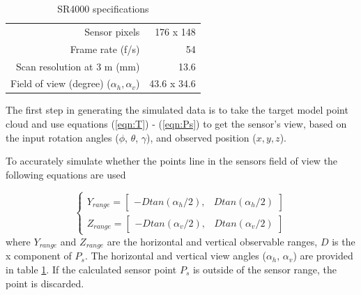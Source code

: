 \documentclass[conference]{IEEEtran}
\begin{document}
		\begin{table}[htbp]
			\caption{SR4000 specifications} %
			\centering
		\begin{tabular}{rr} %
			\hline\hline %
			Sensor pixels & 176 x 148 \\ %
			Frame rate (f/s) & 54 \\
			Scan resolution at 3 m (mm) & 13.6 \\
			Field of view (degree) ($\alpha_h,\alpha_v$) & 43.6 x 34.6 \\[1ex] %
			\hline %
		\end{tabular}
		\label{tab:sr4000_spec}
		\end{table}

		The first step in generating the simulated data is to take the target model point cloud and use equations (\ref{eqn:T}) - (\ref{eqn:Ps}) to get the sensor's view, based on the input rotation angles ($\phi$, $\theta$, $\gamma$), and observed position ($x,y,z$).
		
		To accurately simulate whether the points line in the sensors field of view the following equations are used

		\begin{equation}
			\label{eqn:field_view_eqs}
			\begin{cases}
				Y_{range} = \begin{bmatrix} -Dtan(\alpha_h/2), & Dtan(\alpha_h/2) \end{bmatrix} \\
				Z_{range} = \begin{bmatrix} -Dtan(\alpha_v/2), & Dtan(\alpha_v/2) \end{bmatrix}
			\end{cases}
		\end{equation}
		where $Y_{range}$ and $Z_{range}$ are the horizontal and vertical observable ranges, $D$ is the x component of $P_s$. The horizontal and vertical view angles ($\alpha_h$, $\alpha_v$) are provided in table \ref{tab:sr4000_spec}. If the calculated sensor point $P_s$ is outside of the sensor range, the point is discarded. 

		

	\nocite{*}
	\printbibliography
	
\end{document}
